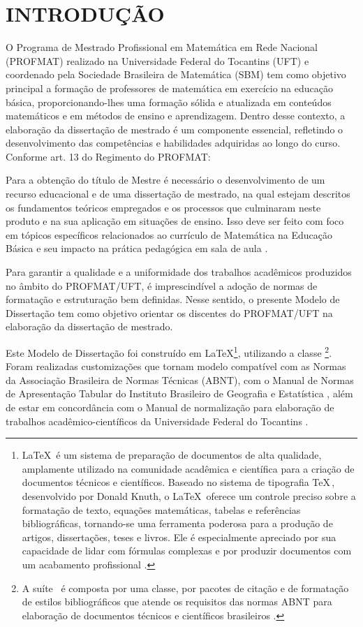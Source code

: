 
\chapter{INTRODUÇÃO}

O Programa de Mestrado Profissional em Matemática em Rede Nacional (PROFMAT) realizado na Universidade Federal do Tocantins (UFT) e  coordenado pela Sociedade Brasileira de Matemática (SBM) tem como objetivo principal a formação de professores de matemática em exercício na educação básica, proporcionando-lhes uma formação sólida e atualizada em conteúdos matemáticos e em métodos de ensino e aprendizagem. Dentro desse contexto, a elaboração da dissertação de mestrado é um componente essencial, refletindo o desenvolvimento das competências e habilidades adquiridas ao longo do curso. Conforme art. 13 do Regimento do PROFMAT:

\begin{citacao}
    Para a obtenção do título de Mestre é necessário o desenvolvimento de um recurso educacional e de uma dissertação de mestrado, na qual estejam descritos os fundamentos teóricos empregados e os processos que culminaram neste produto e na sua aplicação em situações de ensino. Isso deve ser feito com foco em tópicos específicos relacionados ao currículo de Matemática na Educação Básica e seu impacto na prática pedagógica em sala de aula \cite{profmat_regimento}.
\end{citacao}
 

Para garantir a qualidade e a uniformidade dos trabalhos acadêmicos produzidos no âmbito do PROFMAT/UFT, é imprescindível a adoção de normas de formatação e estruturação bem definidas. Nesse sentido, o presente Modelo de Dissertação tem como objetivo orientar os discentes do PROFMAT/UFT na elaboração da dissertação de mestrado.

Este Modelo de Dissertação foi construído em \LaTeX \footnote{\LaTeX\, é um sistema de preparação de documentos de alta qualidade, amplamente utilizado na comunidade acadêmica e científica para a criação de documentos técnicos e científicos. Baseado no sistema de tipografia \TeX\,, desenvolvido por Donald Knuth, o \LaTeX\, oferece um controle preciso sobre a formatação de texto, equações matemáticas, tabelas e referências bibliográficas, tornando-se uma ferramenta poderosa para a produção de artigos, dissertações, teses e livros. Ele é especialmente apreciado por sua capacidade de lidar com fórmulas complexas e por produzir documentos com um acabamento profissional \cite{latex-projeto}.}, utilizando a classe \abnTeX\footnote{A suíte \abnTeX\, é composta por uma classe, por pacotes de citação e de formatação de estilos bibliográficos que atende os requisitos das normas ABNT para elaboração de documentos técnicos e científicos brasileiros \cite{abntex-projeto}.}. Foram realizadas customizações que tornam modelo compatível com as Normas da Associação Brasileira de Normas Técnicas (ABNT), com o Manual de Normas de Apresentação Tabular do Instituto Brasileiro de Geografia e Estatística \cite{ManualIBGE}, além de estar em concordância com o Manual de normalização para elaboração de trabalhos acadêmico-científicos da Universidade Federal do Tocantins \cite{ManualUFT}.

